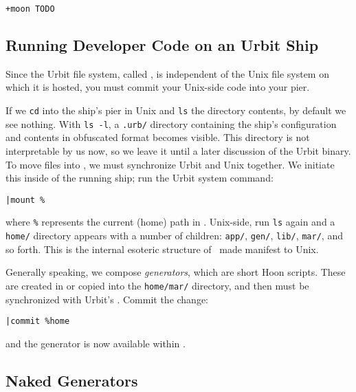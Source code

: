 \begin{lstlisting}[style=nonumbers]
+moon TODO
\end{lstlisting}

\subsection{Running Developer Code on an Urbit Ship}

Since the Urbit file system, called \clay, is independent of the Unix file system on which it is hosted, you must commit your Unix-side code into your pier.

If we \texttt{cd} into the ship's pier in Unix and \texttt{ls} the directory contents, by default we see nothing.  With \texttt{ls -l}, a \texttt{.urb/} directory containing the ship's configuration and contents in obfuscated format becomes visible.  This directory is not interpretable by us now, so we leave it until a later discussion of the Urbit binary.  To move files into \clay, we must synchronize Urbit and Unix together.  We initiate this inside of the running ship; run the Urbit system command:

\begin{lstlisting}[style=nonumbers]
|mount %
\end{lstlisting}

where \texttt{\%} represents the current (home) path in \clay.  Unix-side, run \texttt{ls} again and a \texttt{home/} directory appears with a number of children:  \texttt{app/}, \texttt{gen/}, \texttt{lib/}, \texttt{mar/}, and so forth.  This is the internal esoteric structure of \clay~made manifest to Unix.

Generally speaking, we compose \emph{generators}, which are short Hoon scripts.  These are created in or copied into the \texttt{home/mar/} directory, and then must be synchronized with Urbit's \clay.  Commit the change:

\begin{lstlisting}[style=nonumbers]
|commit %home
\end{lstlisting}

and the generator is now available within \clay.

\subsection{Naked Generators}

